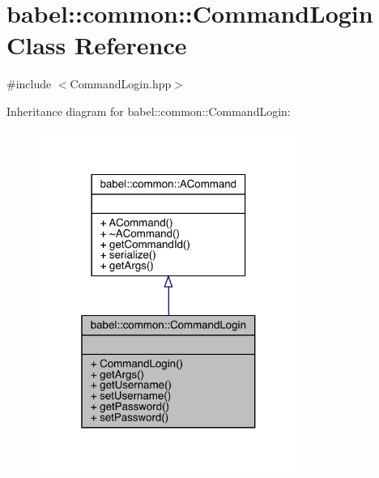 \hypertarget{classbabel_1_1common_1_1_command_login}{}\section{babel\+:\+:common\+:\+:Command\+Login Class Reference}
\label{classbabel_1_1common_1_1_command_login}


{\ttfamily \#include $<$Command\+Login.\+hpp$>$}



Inheritance diagram for babel\+:\+:common\+:\+:Command\+Login\+:\nopagebreak
\begin{figure}[H]
\begin{center}
\leavevmode
\includegraphics[width=241pt]{classbabel_1_1common_1_1_command_login__inherit__graph}
\end{center}
\end{figure}


